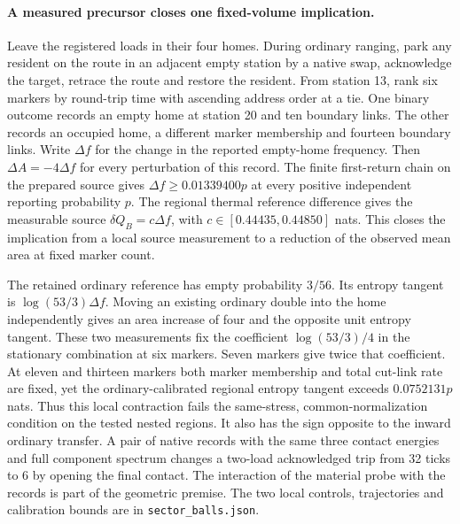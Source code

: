 \documentclass[11pt]{article}
\begin{document}
\paragraph{A measured precursor closes one fixed-volume implication.}
Leave the registered loads in their four homes. During ordinary
ranging, park any resident on the route in an adjacent empty station
by a native swap, acknowledge
the target, retrace the route and restore the resident. From
station 13, rank six markers by round-trip time with ascending address
order at a tie. One binary outcome records an empty home at station 20
and ten boundary links. The other records an occupied home, a
different marker membership and fourteen boundary links. Write
\(\Delta f\) for the change in the reported empty-home frequency.
Then \(\Delta A=-4\Delta f\) for every perturbation of this record.
The finite first-return chain on the prepared source gives
\(\Delta f\ge 0.01339400p\) at every positive independent reporting
probability \(p\). The regional thermal reference difference gives the
measurable source \(\delta Q_B=c\Delta f\), with
\(c\in[0.44435,0.44850]\) nats. This closes the implication from
a local source measurement to a reduction of the observed mean area
at fixed marker count.

The retained ordinary reference has empty probability \(3/56\).
Its entropy tangent is \(\log(53/3)\Delta f\). Moving an existing
ordinary double into the home independently gives an area increase of
four and the opposite unit entropy tangent. These two measurements
fix the coefficient \(\log(53/3)/4\) in the stationary combination
at six markers. Seven markers give twice that coefficient. At eleven
and thirteen markers both marker membership and total cut-link rate
are fixed, yet the ordinary-calibrated regional entropy tangent
exceeds \(0.0752131p\) nats. Thus this local contraction fails the
same-stress, common-normalization condition on the tested nested
regions. It also has the sign opposite to the inward ordinary
transfer. A pair of native records with the same three contact
energies and full component spectrum changes a two-load acknowledged
trip from 32 ticks to 6 by opening the final contact. The interaction
of the material probe with the records is part of the geometric
premise. The two local controls, trajectories and calibration bounds
are in \texttt{sector\_balls.json}.
\end{document}
